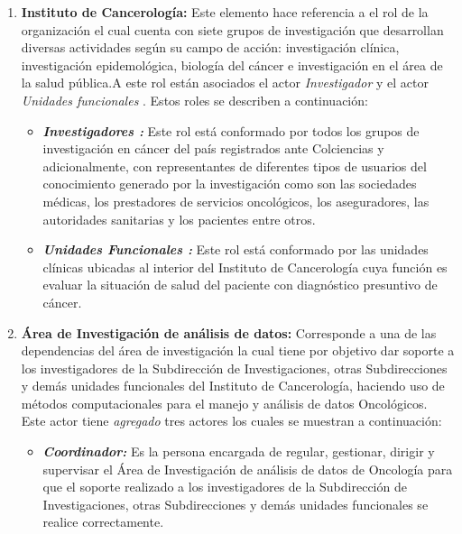 \begin{enumerate}[label=\textbf{\arabic*})]

\item  \textbf{\textbf{Instituto  de Cancerología}:} Este elemento hace referencia a el rol de la organización el cual cuenta con siete grupos de investigación que desarrollan diversas actividades según su campo de acción: investigación clínica, investigación epidemológica, biología del cáncer e investigación en el área de la salud pública.A este rol están asociados el actor \textit{Investigador } y el actor \textit{Unidades funcionales }. Estos roles se describen a continuación: 
\newpage
\begin{itemize}
	\item  \textbf{\textit{Investigadores :}}  Este rol está conformado por todos los grupos de investigación en cáncer del país registrados ante Colciencias y adicionalmente, con representantes de diferentes tipos de usuarios del conocimiento generado por la investigación como son las sociedades médicas, los prestadores de servicios oncológicos, los aseguradores, las autoridades sanitarias y los pacientes entre otros. 
	
	\item  \textbf{\textit{Unidades Funcionales :}}  Este rol está conformado por las unidades clínicas ubicadas al interior del Instituto  de Cancerología cuya función es evaluar la situación de salud del paciente con diagnóstico presuntivo de cáncer. 
\end{itemize}

\item \textbf{Área de Investigación de análisis de datos:} Corresponde a una de las dependencias del área de investigación la cual  tiene por objetivo dar soporte a los investigadores de la Subdirección de Investigaciones, otras Subdirecciones y demás unidades funcionales del Instituto  de Cancerología, haciendo uso de métodos computacionales para el manejo y análisis de datos Oncológicos. Este actor tiene \textit{agregado} tres actores los cuales se muestran a continuación:

\begin{itemize}
\item  \textbf{\textit{Coordinador:}}
Es la persona encargada de regular, gestionar, dirigir y supervisar el Área de Investigación de análisis de datos de Oncología para que el soporte realizado a los investigadores de la Subdirección de Investigaciones, otras Subdirecciones y demás unidades funcionales se realice correctamente.
		

\end{itemize}
\end{enumerate}

